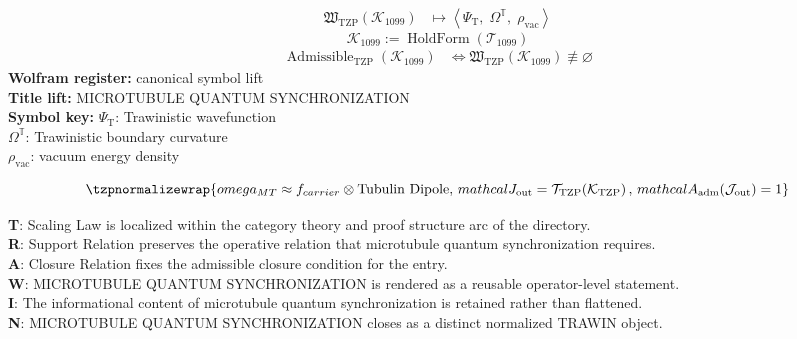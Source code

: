 \noindent
\begin{minipage}[t]{0.48\linewidth}
\begingroup
\small
\[
\begin{aligned}
\mathfrak{W}_{\mathrm{TZP}}\!\left(\mathcal{K}_{1099}\right)
&\longmapsto
\left\langle \Psi_{\mathrm{T}},\; \Omega^{\mathbb{T}},\; \rho_{\mathrm{vac}} \right\rangle
\end{aligned}
\]
\[
\mathcal{K}_{1099}
:=
\operatorname{HoldForm}\!\left(\mathcal{T}_{1099}\right)
\]
\[
\begin{aligned}
\operatorname{Admissible}_{\mathrm{TZP}}\!\left(\mathcal{K}_{1099}\right)
&\Longleftrightarrow
\mathfrak{W}_{\mathrm{TZP}}\!\left(\mathcal{K}_{1099}\right)\not\equiv\varnothing
\end{aligned}
\]
\textbf{Wolfram register:} canonical symbol lift\\
\textbf{Title lift:} MICROTUBULE QUANTUM SYNCHRONIZATION\\
\textbf{Symbol key:} \(\Psi_{\mathrm{T}}\): Trawinistic wavefunction\\ \(\Omega^{\mathbb{T}}\): Trawinistic boundary curvature\\ \(\rho_{\mathrm{vac}}\): vacuum energy density
\par
\endgroup
\end{minipage}\hfill
\begin{minipage}[t]{0.48\linewidth}
\[
\tzpnormalizewrap{omega_{MT} \approx f_{carrier} \otimes \text{Tubulin Dipole},\,mathcal{J}_{\mathrm{out}} = \mathcal{T}_{\mathrm{TZP}}\!\left(\mathcal{K}_{\mathrm{TZP}}\right),\,mathcal{A}_{\mathrm{adm}}\!\left(\mathcal{J}_{\mathrm{out}}\right)=1}
\]

\small
\textbf{T}: Scaling Law is localized within the category theory and proof structure arc of the directory.\\
\textbf{R}: Support Relation preserves the operative relation that microtubule quantum synchronization requires.\\
\textbf{A}: Closure Relation fixes the admissible closure condition for the entry.\\
\textbf{W}: MICROTUBULE QUANTUM SYNCHRONIZATION is rendered as a reusable operator-level statement.\\
\textbf{I}: The informational content of microtubule quantum synchronization is retained rather than flattened.\\
\textbf{N}: MICROTUBULE QUANTUM SYNCHRONIZATION closes as a distinct normalized TRAWIN object.
\normalsize
\end{minipage}

